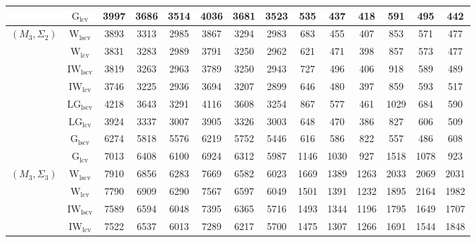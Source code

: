 \begin{table}[!ht]
{\begin{tabular}{@{}cc|ccc|ccc|ccc|ccc@{}}
 & $\mathrm{G}_{\mathrm{lcv}}$ & 3997 & 3686 & 3514 & 4036 & 3681 & 3523 & 535 & 437 & 418 & 591 & 495 & 442 \\ 
\midrule
$(M_3,\Sigma_2)$ & $\mathrm{W}_{\mathrm{lscv}}$ & 3893 & 3313 & 2985 & 3867 & 3294 & 2983 & 683 & \cellcolor{black!30}455 & 407 & 853 & \cellcolor{black!10}571 & \cellcolor{black!10}477 \\ 
 & $\mathrm{W}_{\mathrm{lcv}}$ & 3831 & 3283 & 2989 & 3791 & \cellcolor{black!10}3250 & 2962 & \cellcolor{black!10}621 & 471 & 398 & 857 & 573 & \cellcolor{black!30}477 \\ 
 & $\mathrm{IW}_{\mathrm{lscv}}$ & \cellcolor{black!10}3819 & \cellcolor{black!10}3263 & \cellcolor{black!10}2963 & \cellcolor{black!10}3789 & 3250 & \cellcolor{black!10}2943 & 727 & 496 & 406 & 918 & 589 & 489 \\ 
 & $\mathrm{IW}_{\mathrm{lcv}}$ & \cellcolor{black!30}3746 & \cellcolor{black!30}3225 & \cellcolor{black!30}2936 & \cellcolor{black!30}3694 & \cellcolor{black!30}3207 & \cellcolor{black!30}2899 & 646 & 480 & \cellcolor{black!10}397 & 859 & 593 & 517 \\ 
 & $\mathrm{LG}_{\mathrm{lscv}}$ & 4218 & 3643 & 3291 & 4116 & 3608 & 3254 & 867 & 577 & 461 & 1029 & 684 & 590 \\ 
 & $\mathrm{LG}_{\mathrm{lcv}}$ & 3924 & 3337 & 3007 & 3905 & 3326 & 3003 & 648 & \cellcolor{black!10}470 & \cellcolor{black!30}386 & \cellcolor{black!10}827 & 606 & 509 \\ 
 & $\mathrm{G}_{\mathrm{lscv}}$ & 6274 & 5818 & 5576 & 6219 & 5752 & 5446 & \cellcolor{black!30}616 & 586 & 822 & \cellcolor{black!30}557 & \cellcolor{black!30}486 & 608 \\ 
 & $\mathrm{G}_{\mathrm{lcv}}$ & 7013 & 6408 & 6100 & 6924 & 6312 & 5987 & 1146 & 1030 & 927 & 1518 & 1078 & 923 \\ 
\midrule
$(M_3,\Sigma_3)$ & $\mathrm{W}_{\mathrm{lscv}}$ & 7910 & 6856 & 6283 & 7669 & 6582 & 6023 & 1669 & 1389 & 1263 & 2033 & 2069 & 2031 \\ 
 & $\mathrm{W}_{\mathrm{lcv}}$ & 7790 & 6909 & 6290 & 7567 & 6597 & 6049 & 1501 & 1391 & \cellcolor{black!10}1232 & 1895 & 2164 & 1982 \\ 
 & $\mathrm{IW}_{\mathrm{lscv}}$ & \cellcolor{black!10}7589 & \cellcolor{black!10}6594 & \cellcolor{black!10}6048 & \cellcolor{black!10}7395 & \cellcolor{black!10}6365 & \cellcolor{black!10}5716 & 1493 & \cellcolor{black!10}1344 & \cellcolor{black!30}1196 & 1795 & 1649 & 1707 \\ 
 & $\mathrm{IW}_{\mathrm{lcv}}$ & \cellcolor{black!30}7522 & \cellcolor{black!30}6537 & \cellcolor{black!30}6013 & \cellcolor{black!30}7289 & \cellcolor{black!30}6217 & \cellcolor{black!30}5700 & \cellcolor{black!10}1475 & \cellcolor{black!30}1307 & 1266 & 1691 & 1544 & 1848 \\ 

\end{tabular}}
\end{table}
